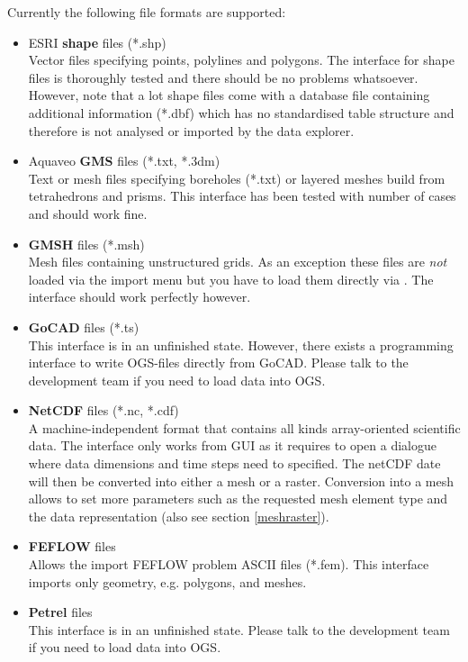 Currently the following file formats are supported:
\begin{itemize}
\item ESRI \textbf{shape} files (*.shp)\\
Vector files specifying points, polylines and polygons. The interface for shape files is thoroughly tested and there should be no problems whatsoever. However, note that a lot shape files come with a database file containing additional information (*.dbf) which has no standardised table structure and therefore is not analysed or imported by the data explorer.
\item Aquaveo \textbf{GMS} files (*.txt, *.3dm)\\
Text or mesh files specifying boreholes (*.txt) or layered meshes build from tetrahedrons and prisms. This interface has been tested with number of cases and should work fine.
\item \textbf{GMSH} files (*.msh)\\
Mesh files containing unstructured grids. As an exception these files are \emph{not} loaded via the import menu but you have to load them directly via . The interface should work perfectly however.
\item \textbf{GoCAD} files (*.ts)\\
This interface is in an unfinished state. However, there exists a programming interface to write OGS-files directly from GoCAD. Please talk to the development team if you need to load data into OGS.
\item \textbf{NetCDF} files (*.nc, *.cdf)\\
A machine-independent format that contains all kinds array-oriented scientific data. The interface only works from GUI as it requires to open a dialogue where data dimensions and time steps need to specified. The netCDF date will then be converted into either a mesh or a raster. Conversion into a mesh allows to set more parameters such as the requested mesh element type and the data representation (also see section \ref{meshraster}).
\item \textbf{FEFLOW} files\\
Allows the import FEFLOW problem ASCII files (*.fem). This interface imports only geometry, e.g. polygons, and meshes.
\item \textbf{Petrel} files\\
This interface is in an unfinished state. Please talk to the development team if you need to load data into OGS.

\end{itemize}
